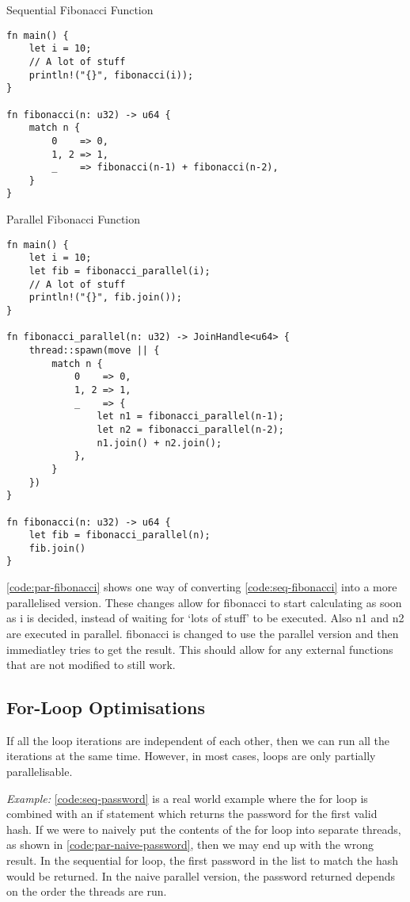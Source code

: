 \documentclass[conference]{IEEEtran}
\begin{document}
\begin{algorithm}
\caption{Sequential Fibonacci Function}
\label{code:seq-fibonacci}
\begin{verbatim}
fn main() {
    let i = 10;
    // A lot of stuff
    println!("{}", fibonacci(i));
}

fn fibonacci(n: u32) -> u64 {
    match n {
        0    => 0,
        1, 2 => 1,
        _    => fibonacci(n-1) + fibonacci(n-2),
    }
}
\end{verbatim}
\end{algorithm}

\begin{algorithm}
\caption{Parallel Fibonacci Function}
\label{code:par-fibonacci}
\begin{verbatim}
fn main() {
    let i = 10;
    let fib = fibonacci_parallel(i);
    // A lot of stuff
    println!("{}", fib.join());
}

fn fibonacci_parallel(n: u32) -> JoinHandle<u64> {
    thread::spawn(move || {
        match n {
            0    => 0,
            1, 2 => 1,
            _    => {
                let n1 = fibonacci_parallel(n-1);
                let n2 = fibonacci_parallel(n-2);
                n1.join() + n2.join();
            },
        }
    })
}

fn fibonacci(n: u32) -> u64 {
    let fib = fibonacci_parallel(n);
    fib.join()
}
\end{verbatim}
\end{algorithm}

\autoref{code:par-fibonacci} shows one way of converting \autoref{code:seq-fibonacci} into a more parallelised version. These changes allow for fibonacci to start calculating as soon as i is decided, instead of waiting for `lots of stuff' to be executed. Also n1 and n2 are executed in parallel. fibonacci is changed to use the parallel version and then immediatley tries to get the result. This should allow for any external functions that are not modified to still work.

\subsection{For-Loop Optimisations}
If all the loop iterations are independent of each other, then we can run all the iterations at the same time. However, in most cases, loops are only partially parallelisable.

\textit{Example:}
\autoref{code:seq-password} is a real world example where the for loop is combined with an if statement which returns the password for the first valid hash. If we were to naively put the contents of the for loop into separate threads, as shown in \autoref{code:par-naive-password}, then we may end up with the wrong result. In the sequential for loop, the first password in the list to match the hash would be returned. In the naive parallel version, the password returned depends on the order the threads are run.
\end{document}

